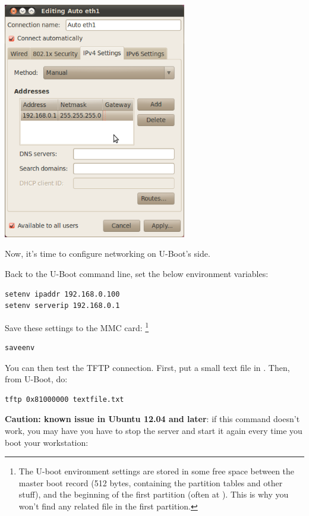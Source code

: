 \begin{center}
\includegraphics[width=8cm]{labs/kernel-board-setup/network-config-3.png}
\end{center}

Now, it's time to configure networking on U-Boot's side.

Back to the U-Boot command line, set the below environment variables:

\begin{verbatim}
setenv ipaddr 192.168.0.100
setenv serverip 192.168.0.1
\end{verbatim}

Save these settings to the MMC card:
\footnote{The U-boot environment settings are stored in some free space
between the master boot record (512 bytes, containing the partition
tables and other stuff), and the beginning of the first partition (often
at ). This is why you won't find any related file in the
first partition.}

\begin{verbatim}
saveenv
\end{verbatim}

You can then test the TFTP connection.  First, put a small text
file in . Then, from U-Boot, do:

\begin{verbatim}
tftp 0x81000000 textfile.txt
\end{verbatim}

{\bf Caution: known issue in Ubuntu 12.04 and later}: if this command
doesn't work, you may have you have to stop the server and start it
again every time you boot your workstation:


